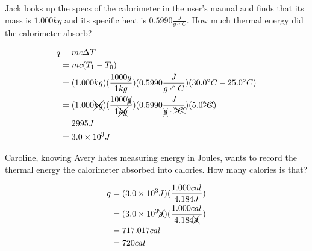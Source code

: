 \documentclass[11pt,addpoints]{exam}   	%
\begin{document}
\begin{questions}
\question[5] Jack looks up the specs of the calorimeter in the user's manual and finds that its mass is $1.000 kg$ and its specific heat is $0.5990 \frac{J}{g \cdot ^{\circ}C}$. 
How much thermal energy did the calorimeter absorb?
\begin{solution}
\begin{equation} 
\begin{split}
   q &= m c \Delta T \\
      &= m c (T_1 - T_0) \\
            &= (1.000 kg) (\frac{1000 g}{1 kg}) (0.5990 \frac{J}{g \cdot ^{\circ} C}) (30.0 ^{\circ}C - 25.0 ^{\circ} C) \\   
      &= (1.000 \xcancel{kg})(\frac{1000 \xcancel{g}}{1 \xcancel{kg}}) (0.5990 \frac{J}{\xcancel{g} \cdot \xcancel{^{\circ} C}})(5.0 \xcancel{^{\circ} C})\\
      &= 2995 J \\
      &= 3.0 \times 10^3 J
 \end{split}
 \end{equation}
 \end{solution}

\question[5] Caroline, knowing Avery hates measuring energy in Joules, wants to record the thermal energy the calorimeter absorbed into calories. How many calories is that?
\begin{solution}
\begin{equation} 
\begin{split}
   q &= (3.0 \times 10^3 J) (\frac{1.000 cal}{4.184 J}) \\
      &= (3.0 \times 10^3 \xcancel{J})(\frac{1.000 cal}{4.184 \xcancel{J}}) \\
      &= 717.017 cal \\
      &= 720 cal                        
 \end{split}
 \end{equation}
 \end{solution}


\end{questions}
\end{document}
